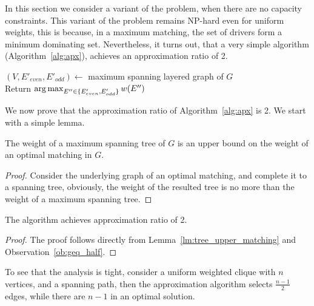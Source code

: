 \label{sub:ucudcm}
In this section we consider a variant of the problem, 
when there are no capacity constraints.
This variant of the problem remains NP-hard even for uniform weights,
this is because, in a maximum matching, the set of drivers form a minimum
dominating set. 
Nevertheless, it turns out, that a very simple algorithm
(Algorithm~\ref{alg:apx}), achieves an approximation ratio of 2.

\begin{algorithm}
\label{alg:apx}
\caption{\UCCARPOOL{}}
$(V, E'_{even}, E'_{odd}) \leftarrow$ maximum spanning layered graph of $G$		\\
Return $\operatorname*{arg\,max}_{E'' \in \{ E'_{even}, E'_{odd} \}}{w(E'')} $	\\
\end{algorithm}

We now prove that the approximation ratio of Algorithm~\ref{alg:apx} is 2.
We start with a simple lemma.

\begin{lemma}
\label{lm:tree_upper_matching}
The weight of a maximum spanning tree of $G$ is an upper bound on the weight of
an optimal matching in $G$.
\end{lemma}

\begin{proof}
Consider the underlying graph of an optimal matching, and complete it to a spanning tree, obviously, the
weight of the resulted tree is no more than the weight of a maximum spanning
tree.
\end{proof}

\begin{theorem}
The \UCCARPOOL{} algorithm achieves approximation ratio of 2.
\end{theorem}

\begin{proof}
The proof follows directly from 
Lemma~\ref{lm:tree_upper_matching} and Observation~\ref{ob:geq_half}.
\end{proof}

To see that the analysis is tight, 
consider a uniform weighted clique with $n$ vertices, 
and a spanning path, 
then the approximation algorithm selects $\frac{n - 1}{2}$ edges, 
while there are $n - 1$ in an optimal solution.  